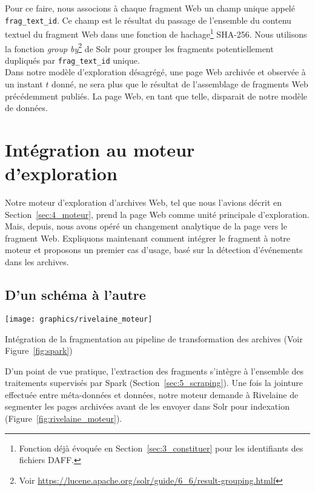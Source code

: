 \documentclass[symmetric,justified,marginals=raggedouter]{tufte-book}
\begin{document}
\noindent Pour ce faire, nous associons à chaque fragment Web un champ unique appelé \texttt{frag\_text\_id}. Ce champ est le résultat du passage de l'ensemble du contenu textuel du fragment Web dans une fonction de hachage\footnote{\RaggedOuter Fonction déjà évoquée en Section~\ref{sec:3_constituer} pour les identifiants des fichiers DAFF.} SHA-256. Nous utilisons la fonction \textit{group by}\footnote{\RaggedOuter Voir \url{https://lucene.apache.org/solr/guide/6_6/result-grouping.htmlf}} de Solr pour grouper les fragments potentiellement dupliqués par \texttt{frag\_text\_id} unique. \\

\noindent Dans notre modèle d'exploration désagrégé, une page Web archivée et observée à un instant $t$ donné, ne sera plus que le résultat de l'assem\-blage de fragments Web précédemment publiés. La page Web, en tant que telle, disparait de notre modèle de données. 

\section{Intégration au moteur d'exploration}
\label{sec:retour_au_moteur}

\noindent Notre moteur d'exploration d'archives Web, tel que nous l'avions décrit en Section~\ref{sec:4_moteur}, prend la page Web comme unité principale d'exploration. Mais, depuis, nous avons opéré un changement analytique de la page vers le fragment Web. Expliquons maintenant comment intégrer le fragment à notre moteur et proposons un premier cas d'usage, basé sur la détection d'événements dans les archives.

\subsection{D'un schéma à l'autre}

\begin{marginfigure}%
  \texttt{[image: graphics/rivelaine\_moteur]}
  \vspace*{0.2cm}  
  \caption{Intégration de la fragmentation au pipeline de transformation des archives (Voir Figure~\ref{fig:spark})}
  \label{fig:rivelaine_moteur}
\end{marginfigure}

\noindent D'un point de vue pratique, l'extraction des fragments s'intègre à l'ensemble des traitements supervisés par Spark (Section~\ref{sec:5_scraping}). Une fois la jointure effectuée entre méta-données et données, notre moteur demande à Rivelaine de segmenter les pages archivées avant de les envoyer dans Solr pour indexation (Figure~\ref{fig:rivelaine_moteur}).
\end{document}
